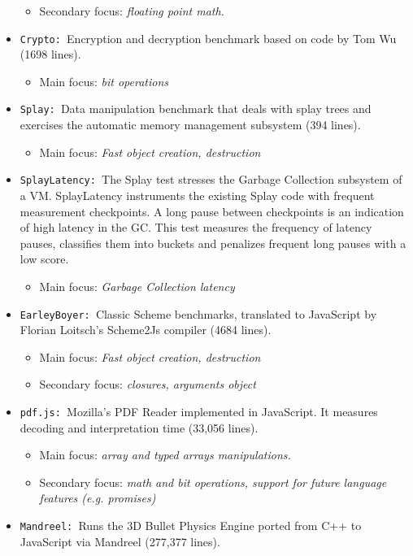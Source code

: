 \begin{itemize}
\begin{itemize}
    \item Secondary focus: \textit{floating point math.}
  \end{itemize}
  \item \texttt{Crypto: }Encryption and decryption benchmark based on code by Tom Wu (1698 lines).
  \begin{itemize}
    \item Main focus: \textit{bit operations}
  \end{itemize}
  \item \texttt{Splay: }Data manipulation benchmark that deals with splay trees and exercises the automatic memory management subsystem (394 lines).
  \begin{itemize}
    \item Main focus: \textit{Fast object creation, destruction}
  \end{itemize}
 \item \texttt{SplayLatency: }The Splay test stresses the Garbage Collection subsystem of a VM. SplayLatency instruments the existing Splay code with frequent measurement checkpoints. A long pause between checkpoints is an indication of high latency in the GC. This test measures the frequency of latency pauses, classifies them into buckets and penalizes frequent long pauses with a low score.
  \begin{itemize}
    \item Main focus: \textit{Garbage Collection latency}
  \end{itemize}
  \item \texttt{EarleyBoyer: }Classic Scheme benchmarks, translated to JavaScript by Florian Loitsch's Scheme2Js compiler (4684 lines).
  \begin{itemize}
    \item Main focus: \textit{Fast object creation, destruction}
    \item Secondary focus: \textit{closures, arguments object}
  \end{itemize}
  \item \texttt{pdf.js: }Mozilla's PDF Reader implemented in JavaScript. It measures decoding and interpretation time (33,056 lines).
  \begin{itemize}
    \item Main focus: \textit{array and typed arrays manipulations.}
    \item Secondary focus: \textit{math and bit operations, support for future language features (e.g. promises)}
  \end{itemize}
  \item \texttt{Mandreel: }Runs the 3D Bullet Physics Engine ported from C++ to JavaScript via Mandreel (277,377 lines).

\end{itemize}
